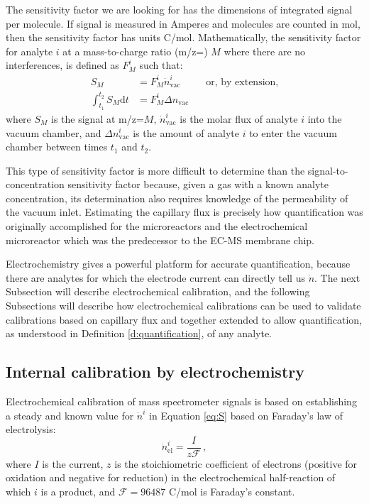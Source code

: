The sensitivity factor we are looking for has the dimensions of integrated signal per molecule. If signal is measured in Amperes and molecules are counted in mol, then the sensitivity factor has units C/mol. Mathematically, the sensitivity factor for analyte $i$ at a mass-to-charge ratio (m/z=) $M$ where there are no interferences, is defined as $F^i_M$ such that:
\begin{align}
S_M &= F_M^i \dot{n}^i_{\text{vac}}\,\hspace{1cm}\text{or, by extension,} \label{eq:S}\\
\int_{t_1}^{t_2} S_M \mathrm{d}t &= F_M^i \Delta n_{\text{vac}} \label{eq:int_S}
\end{align}
where $S_M$ is the signal at m/z=$M$, $\dot{n}^i_\text{vac}$ is the molar flux of analyte $i$ into the vacuum chamber, and $\Delta n_\text{vac}^i$ is the amount of analyte $i$ to enter the vacuum chamber between times $t_1$ and $t_2$.

This type of sensitivity factor is more difficult to determine than the signal-to-concentration sensitivity factor because, given a gas with a known analyte concentration, its determination also requires knowledge of the permeability of the vacuum inlet. Estimating the capillary flux is precisely how quantification was originally accomplished for the microreactors \cite{Henriksen2009} and the electrochemical microreactor which was the predecessor to the EC-MS membrane chip\cite{Trimarco2015}. 

Electrochemistry gives a powerful platform for accurate quantification, because there are analytes for which the electrode current can directly tell us $\dot{n}$. The next Subsection will describe electrochemical calibration, and the following Subsections will describe how electrochemical calibrations can be used to validate calibrations based on capillary flux and together extended to allow quantification, as understood in Definition \ref{d:quantification}, of any analyte.


\subsection{Internal calibration by electrochemistry}\label{subsec:internal}

Electrochemical calibration of mass spectrometer signals is based on establishing a steady and known value for $\dot{n}^i$ in Equation \ref{eq:S} based on Faraday's law of electrolysis:
\begin{equation}
\dot{n}^i_\text{el} = \frac{I}{z\mathcal{F}}\,,\label{eq:Far}
\end{equation}
where $I$ is the current, $z$ is the stoichiometric coefficient of electrons (positive for oxidation and negative for reduction) in the electrochemical half-reaction of which $i$ is a product, and $\mathcal{F}=96487$ C/mol is Faraday's constant.

